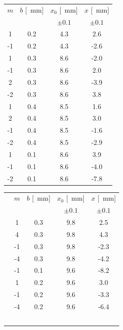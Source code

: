 \documentclass[10pt,oneside,a4paper]{article}
\begin{document}
\begin{minipage}{.5\linewidth}
\begin{center}
\label{tab:misuraLambda}
\begin{tabular}{c|c|c|c}
$m$ & $b$ [\SI{}{mm}] & $x_0$ [\SI{}{mm}] & $x$ [\SI{}{mm}]\\
 & & $\pm 0.1$ & $\pm 0.1$\\
\hline
  1 & 0.2 & 4.3 &  2.6 \\
 -1 & 0.2 & 4.3 & -2.6 \\
  1 & 0.3 & 8.6 & -2.0 \\
 -1 & 0.3 & 8.6 &  2.0 \\
  2 & 0.3 & 8.6 & -3.9 \\
 -2 & 0.3 & 8.6 &  3.8 \\
  1 & 0.4 & 8.5 &  1.6 \\
  2 & 0.4 & 8.5 &  3.0 \\
 -1 & 0.4 & 8.5 & -1.6 \\
 -2 & 0.4 & 8.5 & -2.9 \\
  1 & 0.1 & 8.6 &  3.9 \\
 -1 & 0.1 & 8.6 & -4.0 \\
 -2 & 0.1 & 8.6 & -7.8 \\
\hline
\end{tabular}
\end{center}
\end{minipage}
\quad
\begin{minipage}{.5\linewidth}
\begin{center}
\label{tab:misuraLambda}
\begin{tabular}{cc|c|c|c}
&$m$ & $b$ [\SI{}{mm}] & $x_0$ [\SI{}{mm}] & $x$ [\SI{}{mm}]\\
& & & $\pm 0.1$ & $\pm 0.1$\\
\hline
 & 1 & 0.3 & 9.8 &  2.5 \\
 & 4 & 0.3 & 9.8 &  4.3 \\
 &-1 & 0.3 & 9.8 & -2.3 \\
 &-4 & 0.3 & 9.8 & -4.2 \\
 &-1 & 0.1 & 9.6 & -8.2 \\
 & 1 & 0.2 & 9.6 &  3.0 \\
 &-1 & 0.2 & 9.6 & -3.3 \\
 &-4 & 0.2 & 9.6 & -6.4 \\
\hline\\
\\
\\
\\
\\
\end{tabular}
\end{center}
\end{minipage}
\end{document}

